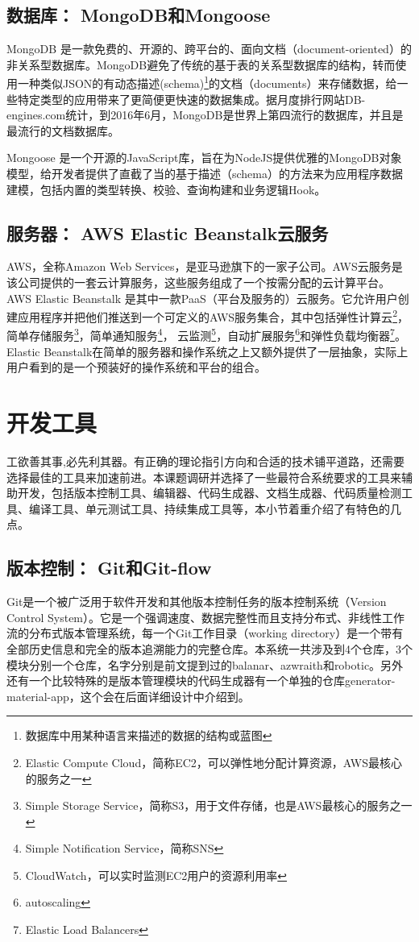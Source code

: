 \subsection{数据库： MongoDB和Mongoose}
MongoDB 是一款免费的、开源的、跨平台的、面向文档（document-oriented）的非关系型数据库。MongoDB避免了传统的基于表的关系型数据库的结构，转而使用一种类似JSON的有动态描述(schema)\footnote{数据库中用某种语言来描述的数据的结构或蓝图}的文档（documents）来存储数据，给一些特定类型的应用带来了更简便更快速的数据集成。据月度排行网站DB-engines.com统计，到2016年6月，MongoDB是世界上第四流行的数据库，并且是最流行的文档数据库。

Mongoose 是一个开源的JavaScript库，旨在为NodeJS提供优雅的MongoDB对象模型，给开发者提供了直截了当的基于描述（schema）的方法来为应用程序数据建模，包括内置的类型转换、校验、查询构建和业务逻辑Hook。
\subsection{服务器： AWS Elastic Beanstalk云服务}
AWS，全称Amazon Web Services，是亚马逊旗下的一家子公司。AWS云服务是该公司提供的一套云计算服务，这些服务组成了一个按需分配的云计算平台。AWS Elastic Beanstalk 是其中一款PaaS（平台及服务的）云服务。它允许用户创建应用程序并把他们推送到一个可定义的AWS服务集合，其中包括弹性计算云\footnote{Elastic Compute Cloud，简称EC2，可以弹性地分配计算资源，AWS最核心的服务之一}，简单存储服务\footnote{Simple Storage Service，简称S3，用于文件存储，也是AWS最核心的服务之一}，简单通知服务\footnote{Simple Notification Service，简称SNS}， 云监测\footnote{CloudWatch，可以实时监测EC2用户的资源利用率}，自动扩展服务\footnote{autoscaling}和弹性负载均衡器\footnote{Elastic Load Balancers}。Elastic Beanstalk在简单的服务器和操作系统之上又额外提供了一层抽象，实际上用户看到的是一个预装好的操作系统和平台的组合。

\section{开发工具}
工欲善其事,必先利其器。有正确的理论指引方向和合适的技术铺平道路，还需要选择最佳的工具来加速前进。本课题调研并选择了一些最符合系统要求的工具来辅助开发，包括版本控制工具、编辑器、代码生成器、文档生成器、代码质量检测工具、编译工具、单元测试工具、持续集成工具等，本小节着重介绍了有特色的几点。
\subsection{版本控制： Git和Git-flow}
Git是一个被广泛用于软件开发和其他版本控制任务的版本控制系统（Version Control System）。它是一个强调速度、数据完整性而且支持分布式、非线性工作流的分布式版本管理系统，每一个Git工作目录（working directory）是一个带有全部历史信息和完全的版本追溯能力的完整仓库。本系统一共涉及到4个仓库，3个模块分别一个仓库，名字分别是前文提到过的balanar、azwraith和robotic。另外还有一个比较特殊的是版本管理模块的代码生成器有一个单独的仓库generator-material-app，这个会在后面详细设计中介绍到。

